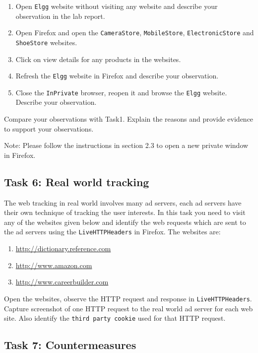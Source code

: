\begin{enumerate}
  \item Open {\tt Elgg} website without visiting any website and describe your observation in the lab report.
  \item Open Firefox and open the {\tt CameraStore}, {\tt MobileStore}, {\tt ElectronicStore} and {\tt ShoeStore} websites.
  \item Click on view details for any products in the websites.
  \item Refresh the {\tt Elgg} website in Firefox and describe your observation.
  \item Close the {\tt InPrivate} browser, reopen it and browse the {\tt Elgg} website. Describe your observation.
\end{enumerate}

Compare your observations with Task1. Explain the reasons and provide evidence to support your observations.

Note: Please follow the instructions in section 2.3 to open a new private window in Firefox.

\subsection{Task 6: Real world tracking}

The web tracking in real world involves many ad servers, each ad servers have their own technique of tracking the user interests. 
In this task you need to visit any of the websites given below and identify the web requests which are sent to the ad servers using the {\tt LiveHTTPHeaders} in Firefox.
The websites are:

\begin{enumerate}
  \item \url{http://dictionary.reference.com}
  \item \url{http://www.amazon.com}
  \item \url{http://www.careerbuilder.com}
\end{enumerate}

Open the websites, observe the HTTP request and response in {\tt LiveHTTPHeaders}. 
Capture screenshot of one HTTP request to the real world ad server for each web site. 
Also identify the {\tt third party cookie} used for that HTTP request.

\subsection{Task 7: Countermeasures}

